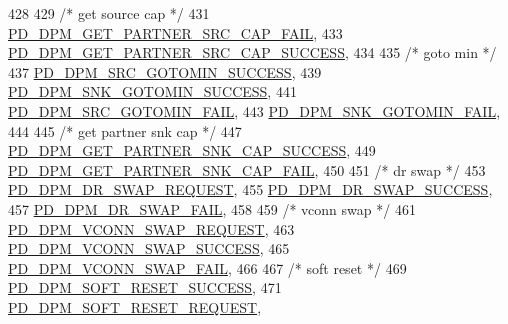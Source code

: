 \begin{DoxyCode}
428 
429     \textcolor{comment}{/* get source cap */}
431     \hyperlink{group__usb__pd__stack_gga6e10571af6af1a42760ea442ab580eb8aee9e5991d19424456884d183c3892e84}{PD\_DPM\_GET\_PARTNER\_SRC\_CAP\_FAIL},
433     \hyperlink{group__usb__pd__stack_gga6e10571af6af1a42760ea442ab580eb8aad63fc26b7c90d0b0882d09609f03c82}{PD\_DPM\_GET\_PARTNER\_SRC\_CAP\_SUCCESS},
434 
435     \textcolor{comment}{/* goto min */}
437     \hyperlink{group__usb__pd__stack_gga6e10571af6af1a42760ea442ab580eb8a818c91e1b20cc978318777720f2c7a3b}{PD\_DPM\_SRC\_GOTOMIN\_SUCCESS},
439     \hyperlink{group__usb__pd__stack_gga6e10571af6af1a42760ea442ab580eb8ae8334e4d49acc42ad9f6365c19f4cad1}{PD\_DPM\_SNK\_GOTOMIN\_SUCCESS},
441     \hyperlink{group__usb__pd__stack_gga6e10571af6af1a42760ea442ab580eb8af4df2566f7dfb5614eab4183fd49d3bb}{PD\_DPM\_SRC\_GOTOMIN\_FAIL},
443     \hyperlink{group__usb__pd__stack_gga6e10571af6af1a42760ea442ab580eb8ac8eef85341e9ed1414592961c242e1e2}{PD\_DPM\_SNK\_GOTOMIN\_FAIL},
444 
445     \textcolor{comment}{/* get partner snk cap */}
447     \hyperlink{group__usb__pd__stack_gga6e10571af6af1a42760ea442ab580eb8acf7e85712657f05298823cf3cbb530dd}{PD\_DPM\_GET\_PARTNER\_SNK\_CAP\_SUCCESS},
449     \hyperlink{group__usb__pd__stack_gga6e10571af6af1a42760ea442ab580eb8a2b5e3e788da63ca93c05e4723fbd6046}{PD\_DPM\_GET\_PARTNER\_SNK\_CAP\_FAIL},
450 
451     \textcolor{comment}{/* dr swap */}
453     \hyperlink{group__usb__pd__stack_gga6e10571af6af1a42760ea442ab580eb8a5f42f19b50481c9b5819e556fba25b94}{PD\_DPM\_DR\_SWAP\_REQUEST},
455     \hyperlink{group__usb__pd__stack_gga6e10571af6af1a42760ea442ab580eb8a6e361b395106973070aef142ed93a6f8}{PD\_DPM\_DR\_SWAP\_SUCCESS},
457     \hyperlink{group__usb__pd__stack_gga6e10571af6af1a42760ea442ab580eb8ac43a8c3be37b3c4c33dd213e2bb1662d}{PD\_DPM\_DR\_SWAP\_FAIL},
458 
459     \textcolor{comment}{/* vconn swap */}
461     \hyperlink{group__usb__pd__stack_gga6e10571af6af1a42760ea442ab580eb8ab62a576276285565837d94af7a289378}{PD\_DPM\_VCONN\_SWAP\_REQUEST},
463     \hyperlink{group__usb__pd__stack_gga6e10571af6af1a42760ea442ab580eb8a599ef1b2e4b2ac816d5eebb00afc6bd6}{PD\_DPM\_VCONN\_SWAP\_SUCCESS},
465     \hyperlink{group__usb__pd__stack_gga6e10571af6af1a42760ea442ab580eb8a7d1d0c1a00df8f90177fef2eaf7f1831}{PD\_DPM\_VCONN\_SWAP\_FAIL},
466 
467     \textcolor{comment}{/* soft reset */}
469     \hyperlink{group__usb__pd__stack_gga6e10571af6af1a42760ea442ab580eb8ad1d3a3dd48dcbb93d29eee4e09093770}{PD\_DPM\_SOFT\_RESET\_SUCCESS},
471     \hyperlink{group__usb__pd__stack_gga6e10571af6af1a42760ea442ab580eb8a55e5b428b44bfbcef61a8fc137370c60}{PD\_DPM\_SOFT\_RESET\_REQUEST},

\end{DoxyCode}
